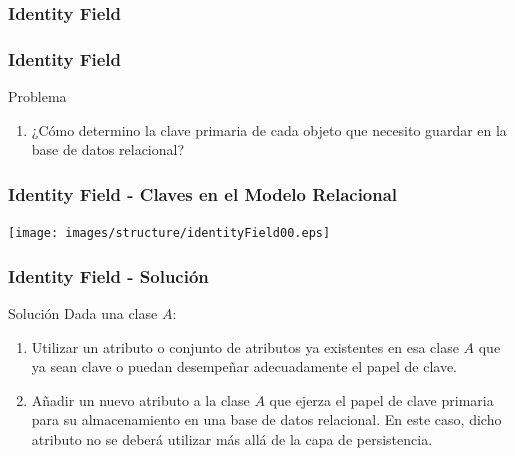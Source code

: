 \documentclass[a4paper,slidestop,xcolor=pst,blue]{beamer}
\begin{document}
\subsubsection{Identity Field}

\begin{frame}[c]
    \frametitle{Identity Field}
    \begin{block}{Problema}
        \begin{enumerate}
            \item ¿Cómo determino la clave primaria de cada objeto que necesito guardar en la base de datos relacional?
        \end{enumerate}
    \end{block}
\end{frame}

\begin{frame}[c]
    \frametitle{Identity Field - Claves en el Modelo Relacional}
    \begin{center}
        \texttt{[image: images/structure/identityField00.eps]}
    \end{center}
\end{frame}

\begin{frame}[c]
    \frametitle{Identity Field - Solución}
    \begin{block}{Solución}
        Dada una clase $A$:
        \begin{enumerate}[<+->]
            \item<2-> Utilizar un atributo o conjunto de atributos ya existentes en esa clase $A$ que ya sean clave o puedan desempeñar adecuadamente el papel de clave.
            \item<3-> Añadir un nuevo atributo a la clase $A$ que ejerza el papel de clave primaria para su almacenamiento en una base de datos relacional. En este caso, dicho atributo no se deberá utilizar más allá de la capa de persistencia.
        \end{enumerate}
    \end{block}
\end{frame}
\end{document}
